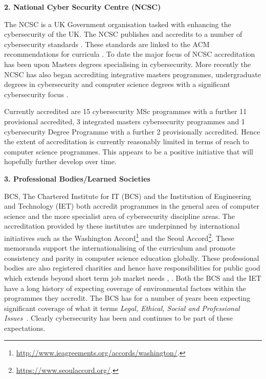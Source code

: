 \documentclass[conference]{IEEEtran}
\begin{document}
\textbf{2. National Cyber Security Centre (NCSC)}

The NCSC is a UK Government organisation tasked with enhancing the cybersecurity of the UK. The NCSC publishes and accredits to a number of cybersecurity standards \cite{NCSC2018a}. These standards are linked to the ACM recommendations for curricula \cite{ACM2013a}. To date the major focus of NCSC accreditation has been upon Masters degrees specialising in cybersecurity. More recently the NCSC has also began accrediting integrative masters programmes, undergraduate degrees in cybersecurity and computer science degrees with a significant cybersecurity focus \cite{NCSC2018b}.

Currently accredited are 15 cybersecurity MSc programmes with a further 11 provisional accredited, 3 integrated masters cybersecurity programmes and 1 cybersecurity Degree Programme with a further 2 provisionally accredited. Hence the extent of accreditation is currently reasonably limited in terms of reach to computer science programmes. This appears to be a positive initiative that will hopefully further develop over time. 

\textbf{3. Professional Bodies/Learned Societies}

BCS, The Chartered Institute for IT (BCS) and the Institution of Engineering and Technology (IET) both accredit programmes in the general area of computer science and the more specialist area of cybersecurity discipline areas. The accreditation provided by these institutes are underpinned by international initiatives such as the Washington Accord\footnote{\url{http://www.ieagreements.org/accords/washington/}.} and the Seoul Accord\footnote{\url{https://www.seoulaccord.org/}.}. These memoranda support the internationalising of the curriculum and promote consistency and parity in computer science education globally.   These professional bodies are also registered charities and hence have responsibilities for public good which extends beyond short term job market needs \cite{Stensaker2006}, \cite{Mutereko2017}. Both the BCS and the IET have a long history of expecting coverage of environmental factors within the programmes they accredit. The BCS has for a number of years been expecting significant coverage of what it terms  {\emph{Legal, Ethical, Social and Professional Issues}}~\cite{Brooke2018}. Clearly cybersecurity has been and continues to be part of these expectations. 
\end{document}
